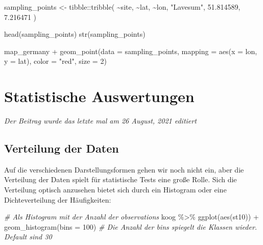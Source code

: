 \documentclass[
]{article}
\newenvironment{Shaded}{\begin{snugshade}}{\end{snugshade}}
\newcommand{\AttributeTok}[1]{\textcolor[rgb]{0.77,0.63,0.00}{#1}}
\newcommand{\CommentTok}[1]{\textcolor[rgb]{0.56,0.35,0.01}{\textit{#1}}}
\newcommand{\DecValTok}[1]{\textcolor[rgb]{0.00,0.00,0.81}{#1}}
\newcommand{\FloatTok}[1]{\textcolor[rgb]{0.00,0.00,0.81}{#1}}
\newcommand{\FunctionTok}[1]{\textcolor[rgb]{0.00,0.00,0.00}{#1}}
\newcommand{\NormalTok}[1]{#1}
\newcommand{\OtherTok}[1]{\textcolor[rgb]{0.56,0.35,0.01}{#1}}
\newcommand{\SpecialCharTok}[1]{\textcolor[rgb]{0.00,0.00,0.00}{#1}}
\newcommand{\StringTok}[1]{\textcolor[rgb]{0.31,0.60,0.02}{#1}}
\begin{document}
\begin{Shaded}
\begin{Highlighting}[]

\NormalTok{sampling\_points }\OtherTok{\textless{}{-}}\NormalTok{ tibble}\SpecialCharTok{::}\FunctionTok{tribble}\NormalTok{(}
  \SpecialCharTok{\textasciitilde{}}\NormalTok{site, }\SpecialCharTok{\textasciitilde{}}\NormalTok{lat, }\SpecialCharTok{\textasciitilde{}}\NormalTok{lon,}
  \StringTok{"Lavesum"}\NormalTok{, }\FloatTok{51.814589}\NormalTok{, }\FloatTok{7.216471}
\NormalTok{)}

\FunctionTok{head}\NormalTok{(sampling\_points)}
\FunctionTok{str}\NormalTok{(sampling\_points)}

\NormalTok{map\_germany }\SpecialCharTok{+}
  \FunctionTok{geom\_point}\NormalTok{(}\AttributeTok{data =}\NormalTok{ sampling\_points, }\AttributeTok{mapping =} \FunctionTok{aes}\NormalTok{(}\AttributeTok{x =}\NormalTok{ lon, }\AttributeTok{y =}\NormalTok{ lat), }\AttributeTok{color =} \StringTok{"red"}\NormalTok{, }\AttributeTok{size =} \DecValTok{2}\NormalTok{)}
\end{Highlighting}
\end{Shaded}

\hypertarget{statistische-auswertungen}{%
\section{Statistische Auswertungen}\label{statistische-auswertungen}}

\emph{Der Beitrag wurde das letzte mal am 26 August, 2021 editiert}

\hypertarget{verteilung-der-daten}{%
\subsection{Verteilung der Daten}\label{verteilung-der-daten}}

Auf die verschiedenen Darstellungsformen gehen wir noch nicht ein, aber die Verteilung der Daten spielt für statistische Tests eine große Rolle. Sich die Verteilung optisch anzusehen bietet sich durch ein Histogram oder eine Dichteverteilung der Häufigkeiten:

\begin{Shaded}
\begin{Highlighting}[]
\CommentTok{\# Als Histogram mit der Anzahl der observations}
\NormalTok{koog }\SpecialCharTok{\%\textgreater{}\%}
  \FunctionTok{ggplot}\NormalTok{(}\FunctionTok{aes}\NormalTok{(st10)) }\SpecialCharTok{+}
  \FunctionTok{geom\_histogram}\NormalTok{(}\AttributeTok{bins =} \DecValTok{100}\NormalTok{) }\CommentTok{\# Die Anzahl der bins spiegelt die Klassen wieder. Default sind 30 }
\end{Highlighting}
\end{Shaded}
\end{document}
